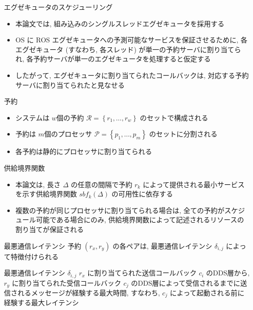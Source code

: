 \begin{frame}{エグゼキュータのスケジューリング}
    \begin{itemize}
        \item 本論文では, 組み込みのシングルスレッドエグゼキュータを採用する
        \item OS に ROS エグゼキュータへの予測可能なサービスを保証させるために, 各エグゼキュータ (すなわち, 各スレッド) が単一の予約サーバに割り当てられ, 各予約サーバが単一のエグゼキュータを処理すると仮定する
        \item したがって, エグゼキュータに割り当てられたコールバックは, 対応する予約サーバに割り当てられたと見なせる
    \end{itemize}
\end{frame}

\begin{frame}{予約}
    \begin{itemize}
        \item システムは $w$個の予約 $\mathcal{R}=\left\{r_{1}, \ldots, r_{w}\right\}$ のセットで構成される
        \item 予約は $m$個のプロセッサ $\mathcal{P}=\left\{p_{1}, \ldots, p_{m}\right\}$ のセットに分割される
        \item 各予約は静的にプロセッサに割り当てられる
    \end{itemize}
\end{frame}

\begin{frame}{供給境界関数}
    \begin{itemize}
        \item 本論文は, 長さ $\Delta$ の任意の間隔で予約 $r_{k}$ によって提供される最小サービスを示す供給境界関数 $sbf_{k}(\Delta)$ \cite{lipari2003resource, shin2003periodic}の可用性に依存する
        \item 複数の予約が同じプロセッサに割り当てられる場合は, 全ての予約がスケジュール可能である場合にのみ, 供給境界関数によって記述されるリソースの割り当てが保証される
    \end{itemize}
\end{frame}

\begin{frame}{最悪通信レイテンシ}
    予約 $\left(r_{x}, r_{y}\right)$ の各ペアは, 最悪通信レイテンシ $\delta_{i, j}$ によって特徴付けられる
    \begin{block}{最悪通信レイテンシ $\delta_{i, j}$}
        $r_x$ に割り当てられた送信コールバック $c_i$ のDDS層から, $r_y$ に割り当てられた受信コールバック $c_j$ のDDS層によって受信されるまでに送信されるメッセージが経験する最大時間, すなわち, $c_j$ によって起動される前に経験する最大レイテンシ
    \end{block}
\end{frame}

